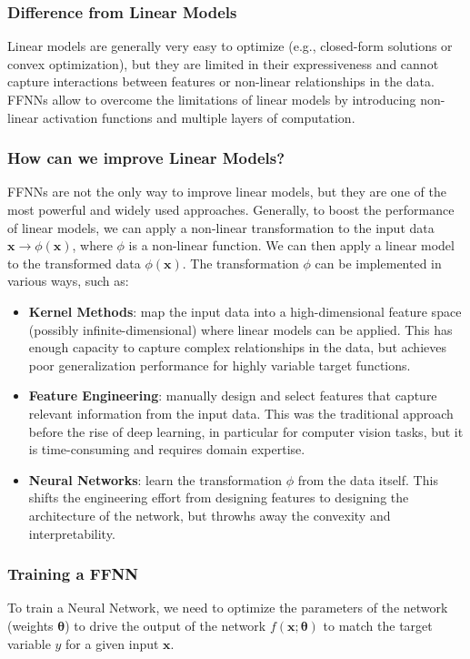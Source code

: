 \subsubsection{Difference from Linear Models}
Linear models are generally very easy to optimize (e.g., closed-form solutions or convex optimization), but they are limited in their expressiveness and cannot capture interactions between features or non-linear relationships in the data.
FFNNs allow to overcome the limitations of linear models by introducing non-linear activation functions and multiple layers of computation.

\subsubsection{How can we improve Linear Models?}
FFNNs are not the only way to improve linear models, but they are one of the most powerful and widely used approaches.
Generally, to boost the performance of linear models, we can apply a non-linear transformation to the input data $\boldsymbol{x} \rightarrow \phi(\boldsymbol{x})$, where $\phi$ is a non-linear function.
We can then apply a linear model to the transformed data $\phi(\boldsymbol{x})$. 
The transformation $\phi$ can be implemented in various ways, such as:
\begin{itemize}
    \item \textbf{Kernel Methods}: map the input data into a high-dimensional feature space (possibly infinite-dimensional) where linear models can be applied.
    This has enough capacity to capture complex relationships in the data, but achieves poor generalization performance for highly variable target functions.
    \item \textbf{Feature Engineering}: manually design and select features that capture relevant information from the input data.
    This was the traditional approach before the rise of deep learning, in particular for computer vision tasks, but it is time-consuming and requires domain expertise.
    \item \textbf{Neural Networks}: learn the transformation $\phi$ from the data itself. This shifts the engineering effort from designing features to designing the architecture of the network,
    but throwhs away the convexity and interpretability. 
\end{itemize}

\subsubsection{Training a FFNN}
To train a Neural Network, we need to optimize the parameters of the network (weights $\boldsymbol{\theta}$) to drive the output of the network $f(\boldsymbol{x}; \boldsymbol{\theta})$
to match the target variable $y$ for a given input $\boldsymbol{x}$.

